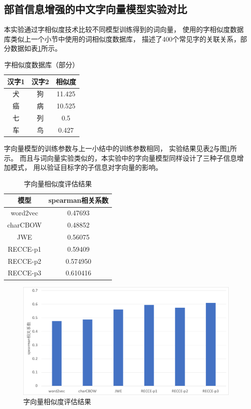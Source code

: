 \subsection{部首信息增强的中文字向量模型实验对比}
本实验通过字相似度技术比较不同模型训练得到的词向量，
使用的字相似度数据库类似上一个小节中使用的词相似度数据库，
描述了400个常见字的关联关系，部分数据如表\ref{charsim_form}所示。

\begin{table}[h]
    \caption{字相似度数据库（部分）}
    \begin{tabular}{|c|c|c|}
        \hline
        汉字1 & 汉字2 & 相似度 \\
        \hline
        犬 & 狗 & 11.425 \\
        \hline
        癌 & 病 & 10.525 \\
        \hline
        七 & 列 & 0.5 \\
        \hline
        车 & 鸟 & 0.427 \\
        \hline
    \end{tabular}
    \label{charsim_form}
    \end{table}
字向量模型的训练参数与上一小结中的训练参数相同，
实验结果见表\ref{char_vec_result}与图\ref{char_sim_pic}所示。
而且与词向量实验类似的，本实验中的字向量模型同样设计了三种子信息增加模式，
用以验证目标字的子信息对字向量的影响。
\begin{table}[!h]
    \caption{字向量相似度评估结果}
    \begin{tabular}{|c|c|}
        \hline
        模型 &  spearman相关系数\\
        \hline
        word2vec & 0.47693 \\
        \hline
        charCBOW & 0.48852 \\
        \hline
        JWE & 0.56075 \\
        \hline
        RECCE-p1 & 0.59409 \\
        \hline
        RECCE-p2 & 0.574950 \\
        \hline
        RECCE-p3 & 0.610416 \\
        \hline
    \end{tabular}
    \label{char_vec_result}
    \end{table}
    \begin{figure}[!h]
        \includegraphics[scale=0.45]{picture/char_sim.pdf}
        \caption{字向量相似度评估结果}
        \label{char_sim_pic}
    \end{figure}

